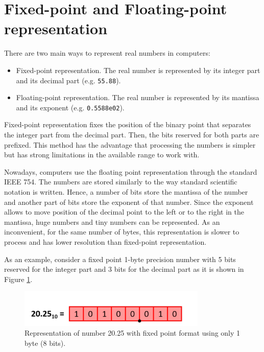     \section{Fixed-point and Floating-point representation}

There are two main ways to represent real numbers in computers: 
\begin{itemize}
    \item Fixed-point representation. 
The real number is represented by its integer part and its decimal part (e.g. \texttt{55.88}). 
    \item Floating-point representation. 
 The real number is represented by its mantissa and its exponent  (e.g. \texttt{0.5588e02}).
\end{itemize} 

Fixed-point representation fixes the position of the binary point that separates 
the integer part from the decimal part. 
Then, the bits reserved for both parts are prefixed. 
This method has the advantage that processing the numbers is simpler
but has strong limitations in the available range  to work with.

Nowadays, computers use the floating point representation through the standard IEEE 754.
The numbers are stored similarly to the way standard scientific notation is written. 
Hence, a number of bits store the mantissa of the number and another part of bits store the exponent 
of that number. 
Since the exponent allows to move position of the decimal point 
to the left or to the right in the mantissa,  huge numbers and tiny numbers can be represented.
As an inconvenient, for the same number of bytes, 
this representation is slower to process and has lower resolution than fixed-point representation. 

As an example, 
consider a fixed point 1-byte precision number with 5 bits reserved for the integer part and 3 bits
for the decimal part as it is shown in Figure \ref{fig:FixedFloat}. 

\begin{figure}[h]
    \centering
    \includegraphics[width= 0.8\textwidth]{./doc/Figures/FixedFloat2.png}
    \caption{Representation of number 20.25 with fixed point format using only 1 byte (8 bits).}
    \label{fig:FixedFloat}
\end{figure}

